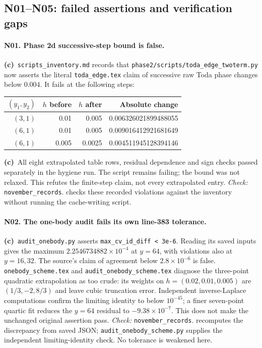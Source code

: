 \documentclass[11pt,a4paper]{article}
\newcommand{\C}{\textbf{(c)}\ }
\newcommand{\file}[1]{\nolinkurl{#1}}
\newcommand{\test}[1]{\textit{Check:} \file{#1}.}
\begin{document}
\subsection{N01--N05: failed assertions and verification gaps}
\paragraph{N01. Phase 2d successive-step bound is false.}
\C \file{scripts_inventory.md} records that
\file{phase2/scripts/toda_edge_twoterm.py} now asserts the literal
\file{toda_edge.tex} claim of successive raw Toda phase changes below $0.004$.
It fails at the following steps:
\begin{center}\small
\begin{tabular}{rrrr}\toprule
$(y_1,y_2)$ & $h$ before & $h$ after & Absolute change\\\midrule
$(3,1)$ & 0.01 & 0.005 & 0.006326021899488055\\
$(6,1)$ & 0.01 & 0.005 & 0.009016412921681649\\
$(6,1)$ & 0.005 & 0.0025 & 0.004511945128394146\\\bottomrule
\end{tabular}\end{center}
\C All eight extrapolated table rows, residual dependence and sign checks
passed separately in the hygiene run. The script remains failing; the bound
was not relaxed. This refutes the finite-step claim, not every extrapolated
entry. \test{november_records} checks these recorded violations against the
inventory without running the cache-writing script.

\paragraph{N02. The one-body audit fails its own line-383 tolerance.}
\C \file{audit_onebody.py} asserts
\file{max_cv_id_diff < 3e-6}. Reading its saved inputs gives the maximum
$2.2546734882\times10^{-4}$ at $y=64$, with violations also at $y=16,32$.
The source's claim of agreement below $2.8\times10^{-6}$ is false.
\file{onebody_scheme.tex} and \file{audit_onebody_scheme.tex} diagnose the
three-point quadratic extrapolation as too crude: its weights on
$h=(0.02,0.01,0.005)$ are $(1/3,-2,8/3)$ and leave cubic truncation error.
Independent inverse-Laplace computations confirm the limiting identity to
below $10^{-45}$; a finer seven-point quartic fit reduces the $y=64$ residual
to $-9.38\times10^{-7}$. This does not make the unchanged original assertion
pass. \test{november_records} recomputes the discrepancy from saved JSON;
\file{audit_onebody_scheme.py} supplies the independent limiting-identity
check. No tolerance is weakened here.
\end{document}
